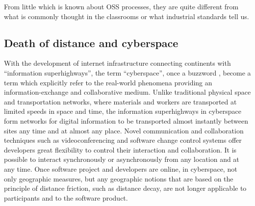 From little which is known about OSS processes, they are quite different from what is 
commonly thought in the classrooms or what industrial standards tell us.

\subsection{Death of distance and cyberspace}
With the development of internet infrastructure connecting continents with ``information
superhighways'', the term ``cyberspace'', once a buzzword \cite{citeulike:11095763}, become 
a term which explicitly refer to the real-world phenomena providing an information-exchange
and collaborative medium. Unlike traditional physical space and transportation networks, where 
materials and workers are transported at limited speeds in space and time, the information 
superhighways in cyberspace form networks for digital information to be transported almost instantly 
between sites any time and at almost any place. 
Novel communication and collaboration techniques such as videoconferencing and software change 
control systems offer developers great flexibility to control their interaction and collaboration. 
It is possible to interact synchronously or asynchronously from any location and at any time. 
Once software project and developers are online, in cyberspace, not only geographic measures, but 
any geographic notions that are based on the principle of distance friction, such as distance decay,
are not longer applicable to participants and to the software product.

